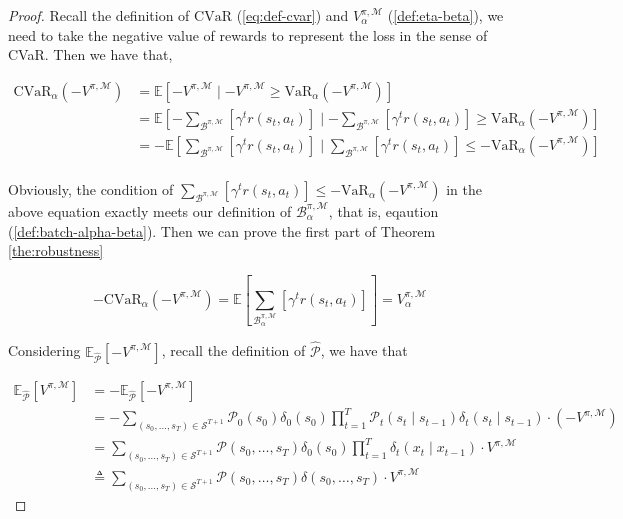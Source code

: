 \begin{proof}
Recall the definition of $\mathrm{CVaR}$ (\ref{eq:def-cvar}) and $V_\alpha^{\pi,\mathcal{M}}$
(\ref{def:eta-beta}), we need to take the negative value of rewards to represent the loss in the sense of CVaR. Then we have that,

\begin{align*}
\mathrm{CVaR}_\alpha(-V^{\pi,\mathcal{M}}) &= \mathbb{E}\left[-V^{\pi,\mathcal{M}}\mid -V^{\pi,\mathcal{M}} \geq \mathrm{VaR}_\alpha(-V^{\pi,\mathcal{M}})\right]\\
&=\mathbb{E}\left[-{\sum}_{\mathcal{B}^{\pi,\mathcal{M}}}\left[\gamma^t r(s_t,a_t)\right]\mid -{\sum}_{\mathcal{B}^{\pi,\mathcal{M}}}\left[\gamma^t r(s_t,a_t)\right] \geq \mathrm{VaR}_\alpha(-V^{\pi,\mathcal{M}})\right]\\
&=-\mathbb{E}\left[{\sum}_{\mathcal{B}^{\pi,\mathcal{M}}}\left[\gamma^t r(s_t,a_t)\right]\mid {\sum}_{\mathcal{B}^{\pi,\mathcal{M}}}\left[\gamma^t r(s_t,a_t)\right] \leq -\mathrm{VaR}_\alpha(-V^{\pi,\mathcal{M}})\right]\\
\end{align*}

Obviously, the condition of ${\sum}_{\mathcal{B}^{\pi,\mathcal{M}}}\left[\gamma^t r(s_t,a_t)\right] \leq -\mathrm{VaR}_\alpha(-V^{\pi,\mathcal{M}})$ in the above equation exactly meets our definition of $\mathcal{B}_\alpha^{\pi,\mathcal{M}}$, that is, eqaution (\ref{def:batch-alpha-beta}). Then we can prove the first part of Theorem \ref{the:robustness}

\begin{equation}
-\mathrm{CVaR}_\alpha(-V^{\pi,\mathcal{M}}) = \mathbb{E}\left[{\sum}_{\mathcal{B}_\alpha^{\pi,\mathcal{M}}}\left[\gamma^t r(s_t,a_t)\right]\right] = V_\alpha^{\pi,\mathcal{M}}
\end{equation}

Considering $\mathbb{E}_{\hat{\mathcal{P}}}[-V^{\pi,\mathcal{M}}]$, recall the definition of $\hat{\mathcal{P}}$, we have that

\begin{align*}
    \mathbb{E}_{\hat{\mathcal{P}}}[V^{\pi,\mathcal{M}}] &= -\mathbb{E}_{\hat{\mathcal{P}}}[-V^{\pi,\mathcal{M}}]\\
    &= -\sum_{(s_0,\ldots,s_T)\in\mathcal{S}^{T+1}}\mathcal{P}_0(s_0)\delta_0(s_0)\prod_{t=1}^{T}\mathcal{P}_t(s_t\mid s_{t-1})\delta_t(s_t\mid s_{t-1})\cdot (-V^{\pi,\mathcal{M}})\\
    &= \sum_{(s_0,\ldots,s_T)\in\mathcal{S}^{T+1}}\mathcal{P}(s_0,\ldots,s_T)\delta_0(s_0)\prod_{t=1}^{T}\delta_t(x_t\mid x_{t-1})\cdot V^{\pi,\mathcal{M}}\\
    &\triangleq \sum_{(s_0,\ldots,s_T)\in\mathcal{S}^{T+1}}\mathcal{P}(s_0,\ldots,s_T)\delta(s_0,\ldots,s_T)\cdot V^{\pi,\mathcal{M}}
\end{align*}


\end{proof}
